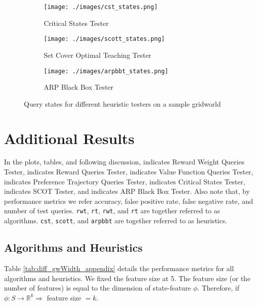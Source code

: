 \begin{figure}[hbtp]
     \centering
     \begin{subfigure}[hbtp]{0.3\textwidth}
         \centering
         \texttt{[image: ./images/cst\_states.png]}
         \caption{Critical States Tester}
         \label{fig:cst}
     \end{subfigure}
    \hspace{5mm}
     \begin{subfigure}[hbtp]{0.3\textwidth}
         \centering
         \texttt{[image: ./images/scott\_states.png]}
         \caption{Set Cover Optimal Teaching Tester}
         \label{fig:scot}
     \end{subfigure}
     \hspace{5mm}
     \begin{subfigure}[hbtp]{0.3\textwidth}
         \centering
         \texttt{[image: ./images/arpbbt\_states.png]}
         \caption{ARP Black Box Tester}
         \label{fig:arpbb}
     \end{subfigure}
        \caption{Query states for different heuristic testers on a sample gridworld}
        \label{fig:heuristics_states}
\end{figure}

\section{Additional Results}
In the plots, tables, and following discussion, {} indicates Reward Weight Queries Tester, {} indicates Reward Queries Tester, {} indicates Value Function Queries Tester, {} indicates Preference Trajectory Queries Tester, {} indicates Critical States Tester, {} indicates SCOT Tester, and {} indicates ARP Black Box Tester. Also note that, by performance metrics we refer accuracy, false positive rate, false negative rate, and number of test queries. \texttt{rwt}, \texttt{rt}, \texttt{rwt}, and \texttt{rt} are together referred to as algorithms. \texttt{cst}, \texttt{scott}, and \texttt{arpbbt} are together referred to as heuristics.

\subsection{Algorithms and Heuristics}
Table \ref{tab:diff_gwWidth_appendix} details the performance metrics for all algorithms and heuristics. We fixed the feature size at 5. The feature size (or the number of features) is equal to the dimension of state-feature $\phi$. Therefore, if $\phi: S \rightarrow \mathbb{R}^k \Rightarrow$ feature size $ = k$. 

